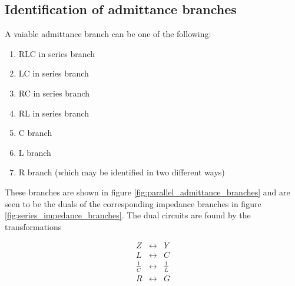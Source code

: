 %


\subsection{Identification of admittance branches} 

A vaiable admittance branch can be one of the following:

\begin{enumerate}
\item  RLC in series branch
\item  LC in series branch
\item  RC in series branch
\item  RL in series branch
\item  C branch
\item  L branch
\item  R branch (which may be identified in two different ways)
\end{enumerate}

These branches are shown in figure \ref{fig:parallel_admittance_branches} and are seen to be the duals of the corresponding impedance branches in figure \ref{fig:series_impedance_branches}. The dual circuits are found by the transformations

\begin{equation} \label{eq:dual_circuits}
\begin{array}{rcl}
Z & \leftrightarrow & Y \\
L & \leftrightarrow & C \\
\frac{1}{C} & \leftrightarrow & \frac{1}{L} \\
R & \leftrightarrow & G
\end{array}
\end{equation}

